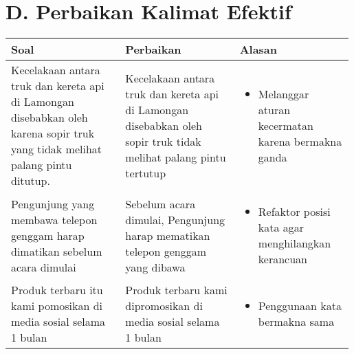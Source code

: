 \documentclass[
	10pt, %
	indonesian
]{assignment}
\begin{document}
\section*{D. Perbaikan Kalimat Efektif}
\begin{center}
	\begin{longtable}{ p{0.33\linewidth} | p{0.33\linewidth} | p{0.33\linewidth}}
		Soal                                                                                                   & Perbaikan & Alasan \\
		\toprule

		Kecelakaan antara truk dan kereta api di Lamongan disebabkan oleh karena sopir
		truk yang tidak melihat palang pintu ditutup.                                                          &
		Kecelakaan antara truk dan kereta api di Lamongan disebabkan oleh sopir truk
		tidak melihat palang pintu tertutup                                                                    &
		\begin{itemize}
			\item Melanggar aturan kecermatan karena bermakna ganda
		\end{itemize}                                                                      \\

		\midrule

		Pengunjung yang membawa telepon genggam harap dimatikan sebelum acara dimulai                          &
		Sebelum acara dimulai, Pengunjung harap mematikan telepon genggam yang dibawa                          &
		\begin{itemize}
			\item Refaktor posisi kata agar menghilangkan kerancuan
		\end{itemize}                                                                      \\

		\midrule

		Produk terbaru itu kami pomosikan di media sosial selama 1 bulan                                       &
		Produk terbaru kami dipromosikan di media sosial selama 1 bulan                                        &
		\begin{itemize}
			\item Penggunaan kata bermakna sama
		\end{itemize}                                                                                          \\

		\midrule


\end{longtable}
\end{center}
\end{document}
